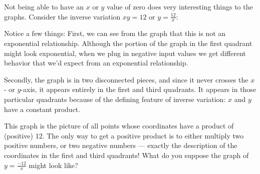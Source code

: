 Not being able to have an $x$ or $y$ value of zero does very interesting things to the graphs. Consider the inverse variation $xy=12$ or $y = \frac{12}{x}$:

\begin{center}
\end{center}


Notice a few things: First, we can see from the graph that this is not an exponential relationship. Although the portion of the graph in the first quadrant might look exponential, when we plug in negative input values we get different behavior that we'd expect from an exponential relationship.

Secondly, the graph is in two disconnected pieces, and since it never crosses the $x$- or $y$-axis, it appears entirely in the first and third quadrants. It appears in those particular quadrants because of the defining feature of inverse variation: $x$ and $y$ have a constant product.

This graph is the picture of all points whose coordinates have a product of (positive) 12. The only way to get a positive product is to either multiply two positive numbers, or two negative numbers --- exactly the description of the coordinates in the first and third quadrants! What do you suppose the graph of $y=\frac{-12}{x}$ might look like?

